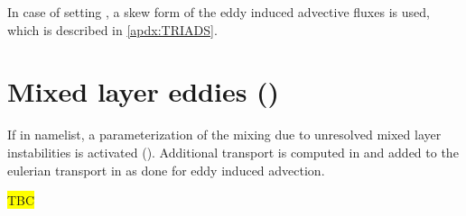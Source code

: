 \documentclass[../main/NEMO_manual]{subfiles}
\begin{document}
In case of setting , a skew form of the eddy induced advective fluxes is used, which is described in \autoref{apdx:TRIADS}.

\section[Mixed layer eddies (\forcode{ln_mle})]{Mixed layer eddies (\protect{})}
\label{sec:LDF_mle}

\begin{listing}
  \caption{}
  \label{lst:namtra_mle}
\end{listing}

If   in  namelist, a parameterization of the mixing due to unresolved mixed layer instabilities is activated (\citet{foxkemper.ferrari_JPO08}). Additional transport is computed in  and added to the eulerian transport in  as done for eddy induced advection.

\colorbox{yellow}{TBC}

\subinc{}
\end{document}
